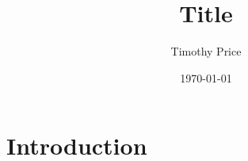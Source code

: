 \documentclass{article}
\title{Title}
\author{Timothy Price}
\date{\today}
\begin{document}
\maketitle

\section{Introduction}
\end{document}
